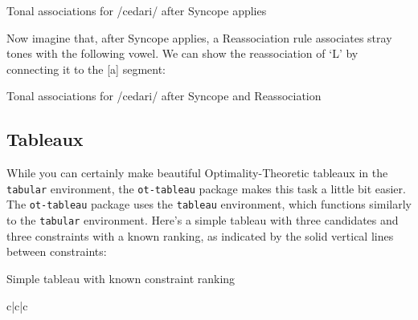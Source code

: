 \documentclass[output=paper,colorlinks,citecolor=brown,
]{langscibook}
\begin{document}
\ea Tonal associations for /cedari/ after Syncope applies

\z

\noindent Now imagine that, after Syncope applies, a Reassociation rule associates stray tones with the following vowel. We can show the reassociation of `L' by connecting it to the [a] segment:

\ea Tonal associations for /cedari/ after Syncope and Reassociation

\z

\subsection{Tableaux}
While you can certainly make beautiful Optimality-Theoretic tableaux in the \texttt{tabular} environment, the \texttt{ot-tableau} package makes this task a little bit easier. The \texttt{ot-tableau} package uses the \texttt{tableau} environment, which functions similarly to the \texttt{tabular} environment. Here's a simple tableau with three candidates and three constraints with a known ranking, as indicated by the solid vertical lines between constraints:

\ea Simple tableau with known constraint ranking

\begin{tableau}{c|c|c} 
 \vio{*!} \vio{} \vio{} 
 \vio{} \vio{} \vio{*}
 \vio{} \vio{*!} \vio{}
\end{tableau}
\z
\end{document}
